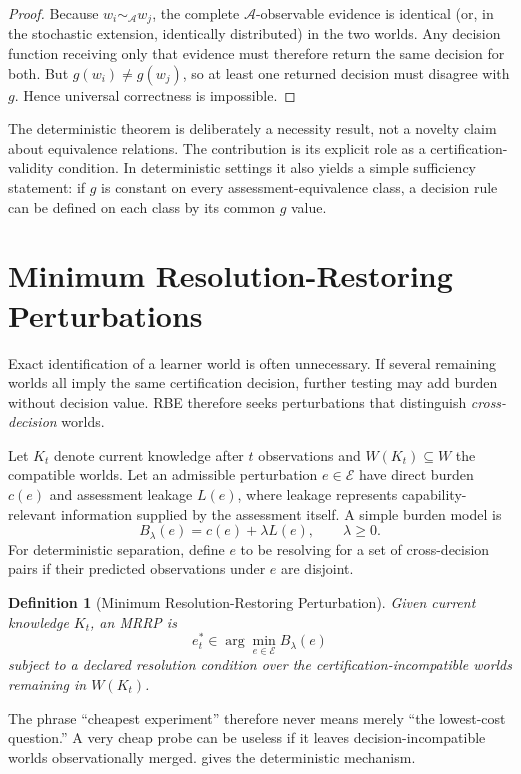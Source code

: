 \documentclass[11pt]{article}
\newtheorem{definition}{Definition}
\newcommand{\cA}{\mathcal{A}}
\newcommand{\cE}{\mathcal{E}}
\begin{document}
\begin{proof}
Because $w_i\sim_{\cA}w_j$, the complete $\cA$-observable evidence is identical (or, in the stochastic extension, identically distributed) in the two worlds. Any decision function receiving only that evidence must therefore return the same decision for both. But $g(w_i)\neq g(w_j)$, so at least one returned decision must disagree with $g$. Hence universal correctness is impossible.
\end{proof}

The deterministic theorem is deliberately a necessity result, not a novelty claim about equivalence relations. The contribution is its explicit role as a certification-validity condition. In deterministic settings it also yields a simple sufficiency statement: if $g$ is constant on every assessment-equivalence class, a decision rule can be defined on each class by its common $g$ value.

\section{Minimum Resolution-Restoring Perturbations}
Exact identification of a learner world is often unnecessary. If several remaining worlds all imply the same certification decision, further testing may add burden without decision value. RBE therefore seeks perturbations that distinguish \emph{cross-decision} worlds.

Let $K_t$ denote current knowledge after $t$ observations and $W(K_t)\subseteq W$ the compatible worlds. Let an admissible perturbation $e\in\cE$ have direct burden $c(e)$ and assessment leakage $L(e)$, where leakage represents capability-relevant information supplied by the assessment itself. A simple burden model is
\[
 B_\lambda(e)=c(e)+\lambda L(e),\qquad \lambda\ge 0.
\]
For deterministic separation, define $e$ to be resolving for a set of cross-decision pairs if their predicted observations under $e$ are disjoint.

\begin{definition}[Minimum Resolution-Restoring Perturbation]
Given current knowledge $K_t$, an MRRP is
\[
 e_t^*\in\arg\min_{e\in\cE} B_\lambda(e)
\]
subject to a declared resolution condition over the certification-incompatible worlds remaining in $W(K_t)$.
\end{definition}

The phrase ``cheapest experiment'' therefore never means merely ``the lowest-cost question.'' A very cheap probe can be useless if it leaves decision-incompatible worlds observationally merged.  gives the deterministic mechanism.
\end{document}
